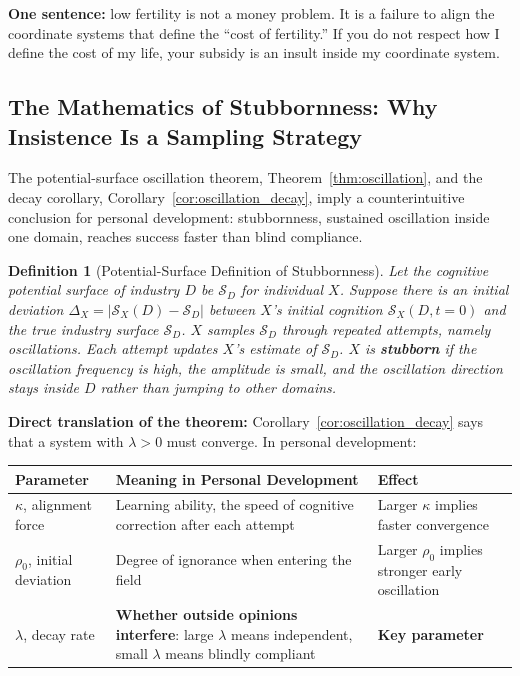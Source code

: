 \documentclass[12pt,a4paper]{article}
\newtheorem{definition}[theorem]{Definition}
\theoremstyle{remark}
\begin{document}
\textbf{One sentence:} low fertility is not a money problem. It is a failure to align the coordinate systems that define the ``cost of fertility.'' If you do not respect how I define the cost of my life, your subsidy is an insult inside my coordinate system.

\subsection{The Mathematics of Stubbornness: Why Insistence Is a Sampling Strategy}

The potential-surface oscillation theorem, Theorem~\ref{thm:oscillation}, and the decay corollary, Corollary~\ref{cor:oscillation_decay}, imply a counterintuitive conclusion for personal development: stubbornness, sustained oscillation inside one domain, reaches success faster than blind compliance.

\begin{definition}[Potential-Surface Definition of Stubbornness]\label{def:stubbornness}
Let the cognitive potential surface of industry $D$ be $\mathcal{S}_D$ for individual $X$. Suppose there is an initial deviation $\Delta_X = |\mathcal{S}_X(D) - \mathcal{S}_D|$ between $X$'s initial cognition $\mathcal{S}_X(D, t=0)$ and the true industry surface $\mathcal{S}_D$. $X$ samples $\mathcal{S}_D$ through repeated attempts, namely oscillations. Each attempt updates $X$'s estimate of $\mathcal{S}_D$. $X$ is \textbf{stubborn} if the oscillation frequency is high, the amplitude is small, and the oscillation direction stays inside $D$ rather than jumping to other domains.
\end{definition}

\textbf{Direct translation of the theorem:} Corollary~\ref{cor:oscillation_decay} says that a system with $\lambda > 0$ must converge. In personal development:

\begin{center}
\begin{tabular}{p{3.5cm} p{5cm} p{5cm}}
\toprule
\textbf{Parameter} & \textbf{Meaning in Personal Development} & \textbf{Effect} \\
\midrule
$\kappa$, alignment force & Learning ability, the speed of cognitive correction after each attempt & Larger $\kappa$ implies faster convergence \\
$\rho_0$, initial deviation & Degree of ignorance when entering the field & Larger $\rho_0$ implies stronger early oscillation \\
$\lambda$, decay rate & \textbf{Whether outside opinions interfere}: large $\lambda$ means independent, small $\lambda$ means blindly compliant & \textbf{Key parameter} \\
\bottomrule
\end{tabular}
\end{center}
\end{document}
